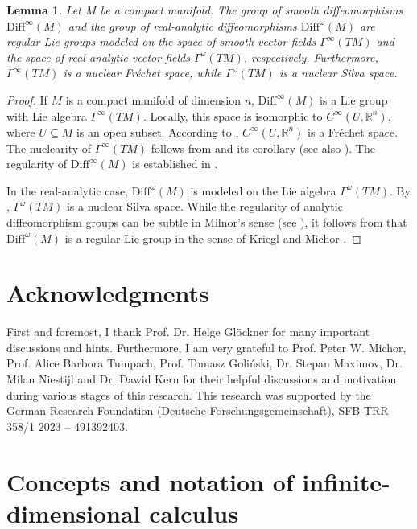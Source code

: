 \documentclass[11pt,reqno]{amsart}
\newtheorem{lemma}[theorem]{Lemma}
\theoremstyle{definition}
\numberwithin{equation}{section}
\begin{document}
\begin{lemma}
Let $M$ be a compact manifold. The group of smooth diffeomorphisms $\mathrm{Diff}^{\infty}(M)$ and the group of real-analytic diffeomorphisms $\mathrm{Diff}^{\omega}(M)$ are regular Lie groups modeled on the space of smooth vector fields $\Gamma^{\infty}(TM)$ and the space of real-analytic vector fields $\Gamma^{\omega}(TM)$, respectively. Furthermore, $\Gamma^{\infty}(TM)$ is a nuclear Fréchet space, while $\Gamma^{\omega}(TM)$ is a nuclear Silva space.
\end{lemma}

\begin{proof}
If $M$ is a compact manifold of dimension $n$, $\mathrm{Diff}^{\infty}(M)$ is a Lie group with Lie algebra $\Gamma^{\infty}(TM)$. Locally, this space is isomorphic to $C^{\infty}(U, \mathbb{R}^n)$, where $U \subseteq M$ is an open subset. According to \cite[Proposition 1.7.16]{11}, $C^{\infty}(U, \mathbb{R}^n)$ is a Fréchet space. The nuclearity of $\Gamma^{\infty}(TM)$ follows from \cite[Theorem 51.5]{31} and its corollary (see also \cite[Lemma 30.3]{20}). The regularity of $\mathrm{Diff}^{\infty}(M)$ is established in \cite[Theorem 43.1]{20}.

In the real-analytic case, $\mathrm{Diff}^{\omega}(M)$ is modeled on the Lie algebra $\Gamma^{\omega}(TM)$. By \cite[Theorem 11.4]{20}, $\Gamma^{\omega}(TM)$ is a nuclear Silva space. While the regularity of analytic diffeomorphism groups can be subtle in Milnor's sense (see \cite{13}), it follows from \cite[Theorem 43.4]{20} that $\mathrm{Diff}^{\omega}(M)$ is a regular Lie group in the sense of Kriegl and Michor \cite[Definition 38.4]{20}.
\end{proof}
\section*{Acknowledgments}
First and foremost, I thank Prof. Dr. Helge Glöckner for many important discussions and hints. %
Furthermore, I am very grateful to Prof. Peter W. Michor, Prof. Alice Barbora Tumpach, Prof. Tomasz Goli{\'n}ski, Dr. Stepan Maximov, Dr. Milan Niestijl and Dr. Dawid Kern for their helpful discussions and motivation during various stages of this research.
This research was supported by the German Research Foundation (Deutsche Forschungsgemeinschaft), SFB-TRR 358/1 2023 – 491392403.

\appendix

\section{Concepts and notation of infinite-dimensional calculus}
\label{appendix:calculus}
\end{document}
